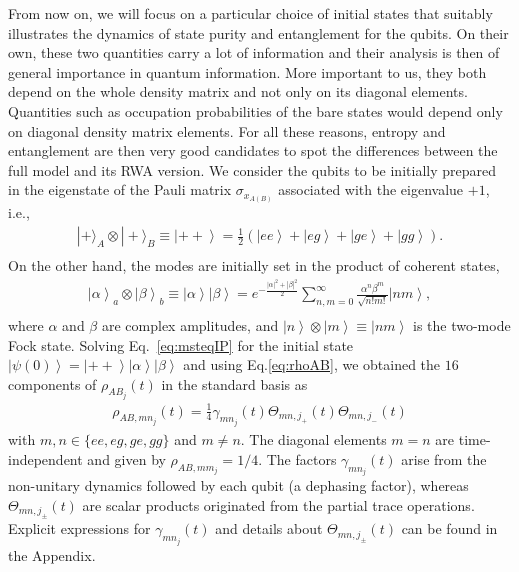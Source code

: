 \documentclass[%
reprint,
amsmath,amssymb,
aps,
pra,
]{revtex4-1}
\newcommand{\ket}[1]{\left| #1 \right>} %
\begin{document}
From now on, we will focus on a particular choice of initial states that suitably illustrates the dynamics of state purity and entanglement for the qubits.  On their own, these two quantities  carry a lot of information and their analysis is then of general importance in quantum information. More important to us, they both depend on the whole density matrix and not only on its diagonal elements. Quantities such as occupation probabilities of the bare states would depend only on diagonal density matrix elements. For all these reasons, entropy and entanglement are then very good candidates to spot the differences between the full model and its RWA version. We consider the qubits to be initially prepared in the eigenstate of the Pauli matrix $\sigma_{x_{A(B)}}$ associated with the eigenvalue $+1$, i.e., 
\begin{eqnarray}
|+\rangle_A\otimes|+\rangle_B\equiv\ket{++}=\frac{1}{2}\left(\ket{ee}+\ket{eg}+\ket{ge}+\ket{gg}\right).\nonumber\\
\label{eq:i2qb}
\end{eqnarray}
On the other hand, the modes are initially set in the product of coherent states, 
\begin{eqnarray}
\ket{\alpha}_a\otimes\ket{\beta}_b\equiv\ket{\alpha}\ket{\beta}=e^{-\frac{|\alpha|^2+|\beta|^2}{2}}\sum_{n,m=0}^{\infty}{\frac{\alpha^{n}\beta^{m}}{\sqrt{n!m!}}\ket{nm}},\nonumber\\
\label{eq:i2md}
\end{eqnarray}
where $\alpha$ and $\beta$ are complex amplitudes, and $\ket{n}\otimes\ket{m}\equiv\ket{nm}$ is the two-mode Fock state. Solving Eq.~\eqref{eq:msteqIP} for the initial state $\ket{\psi(0)}=\ket{++}\ket{\alpha}\ket{\beta}$ and using Eq.\eqref{eq:rhoAB}, we obtained the $16$ components of $\rho_{AB_j}(t)$ in the standard basis as
\begin{eqnarray}
\rho_{AB,mn_j}(t)=\frac{1}{4}\gamma_{mn_j}(t)\Theta_{mn,j_+}(t)\Theta_{mn,j_-}(t)
\label{eq:kmn}
\end{eqnarray}
 with $m,n\in\{ee,eg,ge,gg\}$ and $m\ne n$. The diagonal elements $m=n$ are time-independent and given by $\rho_{AB,mm_j}=1/4$. The factors $\gamma_{mn_j}(t)$ arise from the non-unitary dynamics followed by each qubit (a dephasing factor), whereas $\Theta_{mn,j_\pm}(t)$ are scalar products originated from the partial trace operations. Explicit expressions for $\gamma_{mn_j}(t)$ and details about $\Theta_{mn,j_\pm}(t)$ can be found in the Appendix.
\end{document}
